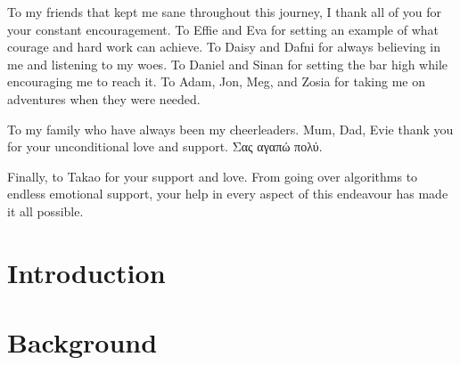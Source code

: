\documentclass[]{phdthesis}
\begin{document}
\begin{acknowledgements}
To my friends that kept me sane throughout this journey, I thank all of you for your constant encouragement. To Effie and Eva for setting an example of what courage and hard work can achieve. To Daisy and Dafni for always believing in me and listening to my woes. To Daniel and Sinan for setting the bar high while encouraging me to reach it. To Adam, Jon, Meg, and Zosia for taking me on adventures when they were needed. 

To my family who have always been my cheerleaders. Mum, Dad, Evie thank you for your unconditional love and support. Σας αγαπώ πολύ. 

Finally, to Takao for your support and love. From going over algorithms to endless emotional support, your help in every aspect of this endeavour has made it all possible. 

\end{acknowledgements}
\tableofcontents*
\listoffigures
\listoftables
{}

\printglossary[type=\acronymtype, title=Abbreviations, toctitle=List of Abbreviations]





\mainmatter*
\chapter{Introduction}
\label{ch:Intro}


\mainmatter*
\chapter{Background}
\label{ch:backg}



%
\end{document}
